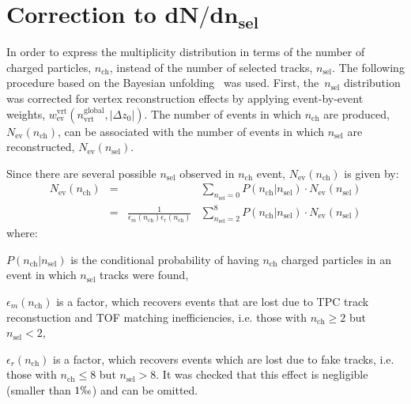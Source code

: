 \section[Correction to $dN/dn_{sel}$]{Correction to $\mathbf{dN/dn_\textrm{sel}}$}\label{section:star_dNdnch}
In order to express the multiplicity distribution in terms of the number of charged particles, $n_\textrm{ch}$, instead of the number of selected tracks, $n_\textrm{sel}$.%
The  following procedure based on the Bayesian unfolding~\cite{unfolding:2016mok,unfolding:DAgostini} was used. First, the~$n_\textrm{sel}$ distribution was corrected for vertex reconstruction effects by applying event-by-event weights, $w_\textrm{ev}^\textrm{vrt}(n_\textrm{vrt}^\textrm{global},|\Delta z_0|)$. The number of events in which $n_\textrm{ch}$ are produced, $N_\textrm{ev}(n_\textrm{ch})$, can be associated with the number of events in which $n_\textrm{sel}$ are reconstructed, $N_\textrm{ev}(n_\textrm{sel})$.

Since there are several possible $n_\textrm{sel}$ observed in  $n_\textrm{ch}$ event,  $N_\textrm{ev}(n_\textrm{ch})$ is given by:
\begin{equation}
\begin{array}{ccccc}
N_\textrm{ev}(n_\textrm{ch})&=&&\displaystyle\sum_{n_\textrm{sel}=0}P(n_\textrm{ch}|n_\textrm{sel})\cdot N_\textrm{ev}(n_\textrm{sel})\\
&=&\frac{1}{\epsilon_{m}(n_\textrm{ch})\epsilon_{r}(n_\textrm{ch})}&\displaystyle\sum_{n_\textrm{sel}=2}^{8}P(n_\textrm{ch}|n_\textrm{sel})\cdot N_\textrm{ev}(n_\textrm{sel})
\end{array}
\end{equation}
where:
\begin{description}
	\item $P(n_\textrm{ch}|n_\textrm{sel})$ is the conditional probability of having $n_\textrm{ch}$ charged particles in an event in which  $n_\textrm{sel}$ tracks were found,
	\item $\epsilon_{m}(n_\textrm{ch})$ is a factor, which recovers events that are lost due to TPC track reconstuction and  TOF matching inefficiencies, i.e. those with $n_\textrm{ch}\geq2$ but $n_\textrm{sel}<2$,
	\item $\epsilon_{r}(n_\textrm{ch})$ is a factor, which recovers  events which are lost due to fake tracks, i.e. those with $n_\textrm{ch}\leq 8$ but $n_\textrm{sel}> 8$. It was checked that this effect is negligible (smaller than $1\permil$) and can be omitted. 
\end{description}
